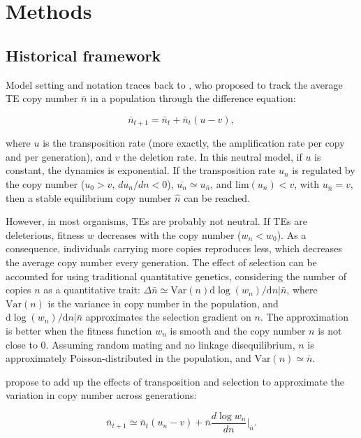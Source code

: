 \documentclass[10pt,a4paper]{article}
\begin{document}
\section{Methods}

\subsection{Historical framework}

Model setting and notation traces back to \cite{CC83}, who proposed to track the average TE copy number $\bar n$ in a population through the difference equation:

\begin{equation}
\bar n_{t+1} = \bar n_t + \bar n_t(u - v),
\end{equation}

\noindent where $u$ is the transposition rate (more exactly, the amplification rate per copy and per generation), and $v$ the deletion rate. 
In this neutral model, if $u$ is constant, the dynamics is exponential. If the transposition rate $u_n$ is regulated by the copy number ($u_0 > v$, $d u_n / d n < 0$), $\overline{u_n} \simeq u_{\bar n}$, and $\mathrm{lim} (u_n) < v$, with $u_{\hat n} = v$, then a stable equilibrium copy number $\hat n$ can be reached. 

However, in most organisms, TEs are probably not neutral. If TEs are deleterious, fitness $w$ decreases with the copy number ($w_n < w_0$). As a consequence, individuals carrying more copies reproduces less, which decreases the average copy number every generation. The effect of selection can be accounted for using traditional quantitative genetics, considering the number of copies $n$ as a quantitative trait: $\Delta \bar n \simeq \mathrm{Var}(n) \mathrm d \log(w_n)/ \mathrm d n | \bar n$, where $\mathrm{Var}(n)$ is the variance in copy number in the population, and $\mathrm d \log(w_n)/ \mathrm d n | \bar n$  approximates the selection gradient on $n$. The approximation is better when the fitness function $w_n$ is smooth and the copy number $n$ is not close to 0. Assuming random mating and no linkage disequilibrium, $n$ is approximately Poisson-distributed in the population, and $\mathrm{Var}(n) \simeq \bar n$. 

\cite{CC83} propose to add up the effects of transposition and selection to approximate the variation in copy number across generations:

\begin{equation}\label{eq:cc2}
\bar n_{t+1} \simeq \bar n_t(u_n - v) + \bar n \frac{d \log w_n}{d n} \Bigr|_{\bar n}.
\end{equation}
\end{document}
